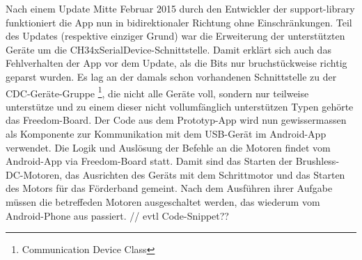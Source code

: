 \newline
Nach einem Update Mitte Februar 2015 durch den Entwickler der support-library funktioniert die App nun 
in bidirektionaler Richtung ohne Einschränkungen. Teil des Updates (respektive einziger Grund) war die 
Erweiterung der unterstützten Geräte um die CH34xSerialDevice-Schnittstelle. Damit erklärt sich auch das 
Fehlverhalten der  App vor dem Update, als die Bits nur bruchstückweise richtig geparst wurden. Es lag 
an der damals schon vorhandenen Schnittstelle zu der CDC-Geräte-Gruppe \footnote{Communication Device Class}, 
die nicht alle Geräte voll, sondern nur teilweise unterstütze und zu einem dieser nicht vollumfänglich 
unterstützen Typen gehörte das Freedom-Board. \newline
Der Code aus dem  Prototyp-App wird nun gewissermassen als Komponente zur Kommunikation mit dem USB-Gerät
im Android-App verwendet. 
\newline
\newline
Die Logik und Auslösung der Befehle an die Motoren findet vom Android-App via Freedom-Board statt. Damit 
sind das Starten der Brushless-DC-Motoren, das Ausrichten des Geräts mit dem Schrittmotor und das Starten 
des Motors für das Förderband gemeint. Nach dem Ausführen ihrer Aufgabe müssen die betreffeden Motoren 
ausgeschaltet werden, das wiederum vom Android-Phone aus passiert.
\newline
\newline
// evtl Code-Snippet??
